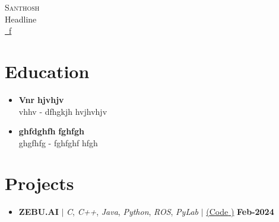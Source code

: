 \documentclass[letterpaper,5pt]{article}
\begin{document}
    

    
    \begin{center}
        {\Huge \scshape Santhosh} \\ \vspace{1pt}
        \large Headline \\ \vspace{1pt}
        \href{mailto:f}{\raisebox{-0.05\height}\faEnvelope \ f} 
         \
         \
         \  
        \vspace{-8pt}
    \end{center}
    
    
      \section{\textbf{Education}}
      
          \begin{itemize}[leftmargin=0in, label={}]
          \item
            \textbf{Vnr} \hfill \textbf{hjvhjv} \\
            vhhv - dfhgkjh \hfill hvjhvhjv
            \vspace*{-3mm}
          \end{itemize}
        
          \begin{itemize}[leftmargin=0in, label={}]
          \item
            \textbf{ghfdghfh} \hfill \textbf{fghfgh} \\
            ghgfhfg - fghfghf \hfill hfgh
            \vspace*{-3mm}
          \end{itemize}
        
        \vspace{3mm}
    
    
    
    \vspace*{-5mm}

    
    
      \section{\textbf{Projects}}
      \begin{itemize}[leftmargin=0in, label={}]
      
        \item[]
        \textbf{ZEBU.AI} $|$ \emph{C}, \emph{C++}, \emph{Java}, \emph{Python}, \emph{ROS}, \emph{PyLab} $|$ \href{link} {({Code} \faExternalLink)}
        \hfill \textbf{Feb-2024}
        \begin{itemize}
            \vspace*{-2mm}
            \ 
            \     
        \end{itemize}
        \vspace{-3mm}

        
    
    \end{itemize}
    \vspace{-15pt}
    
\end{document}
